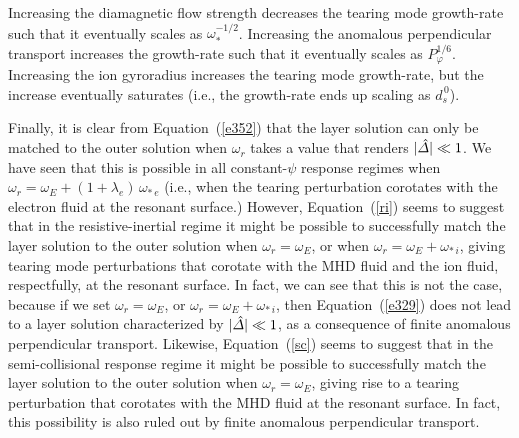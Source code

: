 \documentclass[notitlepage,12pt]{article}
\begin{document}
Increasing  the diamagnetic flow strength decreases the tearing mode growth-rate such that it
eventually scales as $\omega_\ast^{-1/2}$. Increasing the anomalous perpendicular transport increases the
growth-rate such that it  eventually scales as $P_\varphi^{1/6}$. Increasing the ion gyroradius
increases the tearing mode growth-rate, but the increase eventually saturates (i.e., the
growth-rate ends up scaling as $d_s^{\,0}$). 

Finally, it is clear from Equation~(\ref{e352}) that the layer solution can only be matched to the
outer solution when $\omega_r$ takes a value that renders $|\hat{\mit\Delta}|\ll 1$. We have seen that this
is possible in all constant-$\psi$ response regimes when $\omega_r= \omega_E+(1+\lambda_e)\,\omega_{\ast\,e}$
(i.e., when the tearing perturbation corotates with the electron fluid at the resonant surface.) However, Equation~(\ref{ri})
seems to suggest that in the resistive-inertial regime it might be possible to successfully match the
layer solution to the outer solution when $\omega_r=\omega_E$, or when $\omega_r=\omega_E+\omega_{\ast\,i}$,
giving tearing mode perturbations that corotate with the MHD fluid and the ion fluid, respectfully, at the resonant
surface. In fact, we can see that this is not the case, because if we set $\omega_r=\omega_E$, or $\omega_r=\omega_E+\omega_{\ast\,i}$,  then Equation~(\ref{e329}) does not lead to a layer solution characterized by  $|\hat{\mit\Delta}|\ll 1$, 
as a consequence of finite anomalous perpendicular transport. Likewise, Equation~(\ref{sc}) seems to suggest that in the semi-collisional response regime it might be possible to successfully match the
layer solution to the outer solution when $\omega_r=\omega_E$, giving rise to a tearing perturbation that corotates with the MHD fluid at the resonant surface.  In fact, this possibility is also ruled out by finite anomalous
perpendicular transport. 
\end{document}
